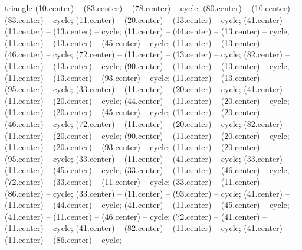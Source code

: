 \begin{pgfonlayer}{triangle}
 (10.center) -- (83.center) -- (78.center) -- cycle; 
 (80.center) -- (10.center) -- (83.center) -- cycle; 
 (11.center) -- (20.center) -- (13.center) -- cycle; 
 (41.center) -- (11.center) -- (13.center) -- cycle; 
 (11.center) -- (44.center) -- (13.center) -- cycle; 
 (11.center) -- (13.center) -- (45.center) -- cycle; 
 (11.center) -- (13.center) -- (46.center) -- cycle; 
 (72.center) -- (11.center) -- (13.center) -- cycle; 
 (82.center) -- (11.center) -- (13.center) -- cycle; 
 (90.center) -- (11.center) -- (13.center) -- cycle; 
 (11.center) -- (13.center) -- (93.center) -- cycle; 
 (11.center) -- (13.center) -- (95.center) -- cycle; 
 (33.center) -- (11.center) -- (20.center) -- cycle; 
 (41.center) -- (11.center) -- (20.center) -- cycle; 
 (44.center) -- (11.center) -- (20.center) -- cycle; 
 (11.center) -- (20.center) -- (45.center) -- cycle; 
 (11.center) -- (20.center) -- (46.center) -- cycle; 
 (72.center) -- (11.center) -- (20.center) -- cycle; 
 (82.center) -- (11.center) -- (20.center) -- cycle; 
 (90.center) -- (11.center) -- (20.center) -- cycle; 
 (11.center) -- (20.center) -- (93.center) -- cycle; 
 (11.center) -- (20.center) -- (95.center) -- cycle; 
 (33.center) -- (11.center) -- (41.center) -- cycle; 
 (33.center) -- (11.center) -- (45.center) -- cycle; 
 (33.center) -- (11.center) -- (46.center) -- cycle; 
 (72.center) -- (33.center) -- (11.center) -- cycle; 
 (33.center) -- (11.center) -- (86.center) -- cycle; 
 (33.center) -- (11.center) -- (93.center) -- cycle; 
 (41.center) -- (11.center) -- (44.center) -- cycle; 
 (41.center) -- (11.center) -- (45.center) -- cycle; 
 (41.center) -- (11.center) -- (46.center) -- cycle; 
 (72.center) -- (41.center) -- (11.center) -- cycle; 
 (41.center) -- (82.center) -- (11.center) -- cycle; 
 (41.center) -- (11.center) -- (86.center) -- cycle; 

\end{pgfonlayer}
